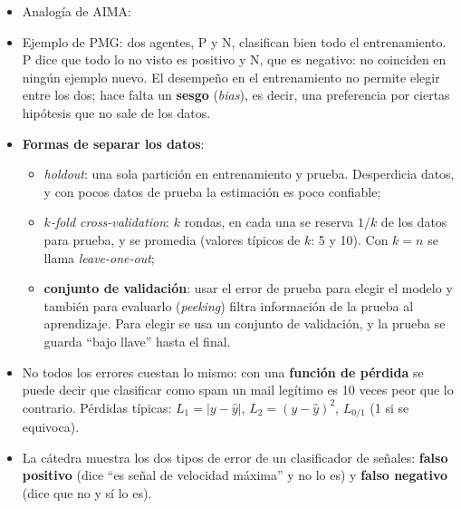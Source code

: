 \documentclass[11pt,a4paper]{article}
\begin{document}
\begin{extras}
\begin{itemize}
  \item Analogía de AIMA: 
  \item Ejemplo de PMG: dos agentes, P y N, clasifican bien todo el entrenamiento. P dice que todo lo no visto es positivo y N, que es negativo: no coinciden en ningún ejemplo nuevo. El desempeño en el entrenamiento no permite elegir entre los dos; hace falta un \textbf{sesgo} (\textit{bias}), es decir, una preferencia por ciertas hipótesis que no sale de los datos.
  \item \textbf{Formas de separar los datos}:
  \begin{itemize}
    \item \textit{holdout}: una sola partición en entrenamiento y prueba. Desperdicia datos, y con pocos datos de prueba la estimación es poco confiable;
    \item \textit{$k$-fold cross-validation}: $k$ rondas, en cada una se reserva $1/k$ de los datos para prueba, y se promedia (valores típicos de $k$: 5 y 10). Con $k=n$ se llama \textit{leave-one-out};
    \item \textbf{conjunto de validación}: usar el error de prueba para elegir el modelo y también para evaluarlo (\textit{peeking}) filtra información de la prueba al aprendizaje. Para elegir se usa un conjunto de validación, y la prueba se guarda ``bajo llave'' hasta el final.
  \end{itemize}
  \item No todos los errores cuestan lo mismo: con una \textbf{función de pérdida} se puede decir que clasificar como spam un mail legítimo es 10 veces peor que lo contrario. Pérdidas típicas: $L_1 = |y-\hat y|$, $L_2 = (y-\hat y)^2$, $L_{0/1}$ (1 si se equivoca).
  \item La cátedra muestra los dos tipos de error de un clasificador de señales: \textbf{falso positivo} (dice ``es señal de velocidad máxima'' y no lo es) y \textbf{falso negativo} (dice que no y sí lo es).
\end{itemize}
\end{extras}

\end{document}
